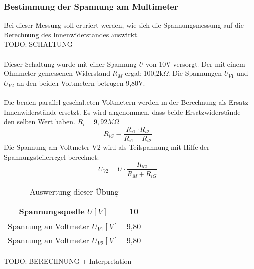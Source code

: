 \subsubsection{Bestimmung der Spannung am Multimeter}
Bei dieser Messung soll eruriert werden, wie sich die Spannungsmessung auf die Berechnung des Innenwiderstandes auswirkt.
~\\
TODO: SCHALTUNG		\\
~\\
Dieser Schaltung wurde mit einer Spannung $U$ von 10V versorgt. Der mit einem Ohmmeter gemessenen Widerstand $R_M$ ergab 100,2k$\Omega$. Die Spannungen $U_{V1}$ und $U_{V2}$ an den beiden Voltmetern betrugen 9,80V.	\\
~\\
Die beiden parallel geschalteten Voltmetern werden in der Berechnung als Ersatz-Innenwiderstände ersetzt. Es wird angenommen, dass beide Ersatzwiderstände den selben Wert haben. $R_i = 9,92 M\Omega$
\begin{equation}
	R_{iG} = \dfrac{R_{i1} \cdot R_{i2}}{R_{i1} + R_{i2}}
\end{equation}
Die Spannung am Voltmeter V2 wird als Teilspannung mit Hilfe der Spannungsteilerregel berechnet:
\begin{equation}
	U_{V2} = U \cdot \dfrac{R_{iG}}{R_M + R_{iG}}
\end{equation}
\begin{table}[h]
	\centering
	\begin{tabular}{|c|c|}
	\hline 
	Spannungsquelle $U [V]$			& 10 		\\ 
	\hline 
	Spannung an Voltmeter $U_{V1} [V]$ 	& 9,80	\\ 
	\hline 
	Spannung an Voltmeter $U_{V2} [V]$ 	& 9,80	\\ 
	\hline 
	\end{tabular}
	\caption{Auswertung dieser Übung}
\end{table}
TODO: BERECHNUNG + Interpretation

